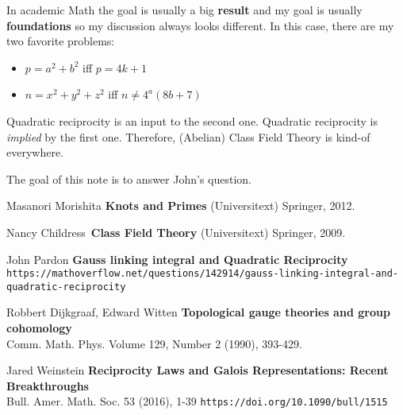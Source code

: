 \documentclass[12pt]{article}
\begin{document}
In academic Math the goal is usually a big \textbf{result} and my goal is usually \textbf{foundations} so my discussion always looks different.  In this case, there are my two favorite problems:
\begin{itemize}
\item $p = a^2 + b^2$ iff $p = 4k+1$
\item $n = x^2 + y^2 + z^2$ iff $n \neq 4^a (8b+7)$
\end{itemize}
Quadratic reciprocity is an input to the second one. Quadratic reciprocity is \textit{implied} by the first one.  Therefore, (Abelian) Class Field Theory is kind-of everywhere. 

\newpage

\noindent The goal of this note is to answer John's question.

\vfill

\begin{thebibliography}{}

\item Masanori Morishita \textbf{Knots and Primes} (Universitext) Springer, 2012.

\item Nancy Childress \;\;\;\,\textbf{Class Field Theory} (Universitext) Springer, 2009.

\item John Pardon \textbf{Gauss linking integral and Quadratic Reciprocity}  \\
\texttt{https://mathoverflow.net/questions/142914/gauss-linking-integral-and-quadratic-reciprocity}

\item Robbert Dijkgraaf, Edward Witten \textbf{Topological gauge theories and group cohomology} \\ 
Comm. Math. Phys. Volume 129, Number 2 (1990), 393-429.


\item  Jared Weinstein \textbf{Reciprocity Laws and Galois Representations: Recent Breakthroughs} \\ 
Bull. Amer. Math. Soc. 53 (2016), 1-39 \hfill \texttt{https://doi.org/10.1090/bull/1515} 

\end{thebibliography}
\end{document}
